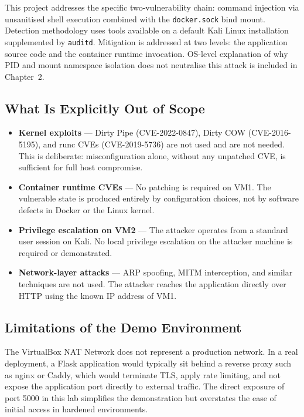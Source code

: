 This project addresses the specific two-vulnerability chain: command injection
via unsanitised shell execution combined with the \texttt{docker.sock} bind
mount. Detection methodology uses tools available on a default Kali Linux
installation supplemented by \texttt{auditd}. Mitigation is addressed at two
levels: the application source code and the container runtime invocation.
OS-level explanation of why PID and mount namespace isolation does not
neutralise this attack is included in Chapter~2.

\subsection{What Is Explicitly Out of Scope}

\begin{itemize}
  \item \textbf{Kernel exploits} --- Dirty Pipe (CVE-2022-0847), Dirty COW
    (CVE-2016-5195), and runc CVEs (CVE-2019-5736) are not used and are not
    needed. This is deliberate: misconfiguration alone, without any unpatched
    CVE, is sufficient for full host compromise.
  \item \textbf{Container runtime CVEs} --- No patching is required on VM1. The
    vulnerable state is produced entirely by configuration choices, not by
    software defects in Docker or the Linux kernel.
  \item \textbf{Privilege escalation on VM2} --- The attacker operates from a
    standard user session on Kali. No local privilege escalation on the attacker
    machine is required or demonstrated.
  \item \textbf{Network-layer attacks} --- ARP spoofing, MITM interception, and
    similar techniques are not used. The attacker reaches the application
    directly over HTTP using the known IP address of VM1.
\end{itemize}

\subsection{Limitations of the Demo Environment}

The VirtualBox NAT Network does not represent a production network. In a real
deployment, a Flask application would typically sit behind a reverse proxy such
as nginx or Caddy, which would terminate TLS, apply rate limiting, and not
expose the application port directly to external traffic. The direct exposure of
port 5000 in this lab simplifies the demonstration but overstates the ease of
initial access in hardened environments.

